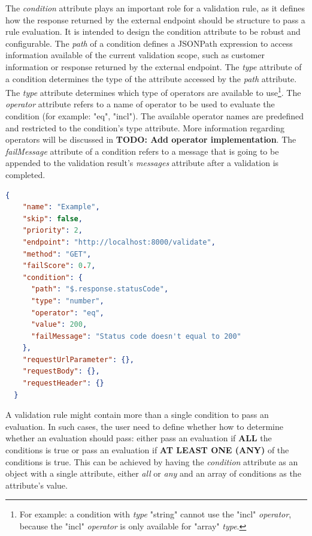 The \emph{condition} attribute plays an important role for a validation rule, as it defines how the response returned by the external endpoint should be structure to pass a rule evaluation. It is intended to design the condition attribute to be robust and configurable. The \emph{path} of a condition defines a JSONPath\autocite{Friesen2019} expression to access information available of the current validation scope, such as customer information or response returned by the external endpoint. The \emph{type} attribute of a condition determines the type of the attribute accessed by the \emph{path} attribute. The \emph{type} attribute determines which type of operators are available to use\footnote{For example: a condition with \emph{type} "string" cannot use the "incl" \emph{operator}, because the "incl" \emph{operator} is only available for "array" \emph{type}.}. The \emph{operator} attribute refers to a name of operator to be used to evaluate the condition (for example: "eq", "incl"). The available operator names are predefined and restricted to the condition's type attribute. More information regarding operators will be discussed in \textbf{TODO: Add operator implementation}. The \emph{failMessage} attribute of a condition refers to a message that is going to be appended to the validation result's \emph{messages} attribute after a validation is completed.

\begin{lstlisting}[caption={Validation rule example (JSON)}, language=json]
  {
    "name": "Example",
    "skip": false,
    "priority": 2,
    "endpoint": "http://localhost:8000/validate",
    "method": "GET",
    "failScore": 0.7,
    "condition": {
      "path": "$.response.statusCode",
      "type": "number",
      "operator": "eq",
      "value": 200,
      "failMessage": "Status code doesn't equal to 200"
    },
    "requestUrlParameter": {},
    "requestBody": {},
    "requestHeader": {}
  }
\end{lstlisting}

A validation rule might contain more than a single condition to pass an evaluation. In such cases, the user need to define whether how to determine whether an evaluation should pass: either pass an evaluation if \textbf{ALL} the conditions is true or pass an evaluation if \textbf{AT LEAST ONE (ANY)} of the conditions is true. This can be achieved by having the \emph{condition} attribute as an object with a single attribute, either \emph{all} or \emph{any} and an array of conditions as the attribute's value.

